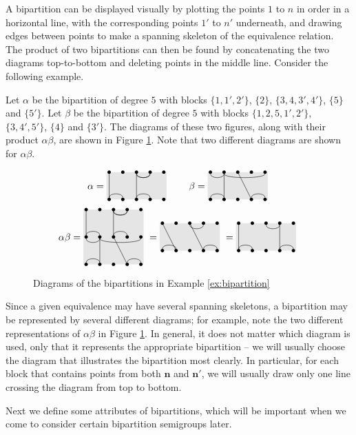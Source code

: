 A bipartition can be displayed visually by plotting the points $1$ to $n$ in
order in a horizontal line, with the corresponding points $1'$ to $n'$
underneath, and drawing edges between points to make a spanning skeleton of the
equivalence relation.  The product of two bipartitions can then be found by
concatenating the two diagrams top-to-bottom and deleting points in the middle
line.  Consider the following example.

\begin{example}
  \label{ex:bipartition}
  Let $\alpha$ be the bipartition of degree $5$ with blocks $\{1, 1', 2'\}$,
  $\{2\}$, $\{3, 4, 3', 4'\}$, $\{5\}$ and $\{5'\}$.  Let $\beta$ be the
  bipartition of degree $5$ with blocks $\{1, 2, 5, 1', 2'\}$, $\{3, 4', 5'\}$,
  $\{4\}$ and $\{3'\}$.  The diagrams of these two figures, along with their
  product $\alpha \beta$, are shown in Figure \ref{fig:bipartition-example}.
  Note that two different diagrams are shown for $\alpha \beta$.
  \begin{figure}[ht]
    \centering
    $$\alpha = \bipartdiag{\tv11\bc12 \tc34 \tv33\tc34\bc34} \qquad
    \beta = \bipartdiag{\tc12\tc25\tv22\bc12 \tv34\bc45}$$
    $$\alpha \beta = \doublebipartdiag{\utv11\ubc12 \utc34 \utv33\utc34\ubc34
      \tc12\tc25\tv22\bc12 \tv34\bc45}
    = \bipartdiag{\tv12\bc12 \tc34\tv34\bc45}
    = \bipartdiag{\tv11\bc12 \tc34\tv44\bc45}$$
    \caption{Diagrams of the bipartitions in Example \ref{ex:bipartition}}
    \label{fig:bipartition-example}
  \end{figure}
\end{example}

Since a given equivalence may have several spanning skeletons, a bipartition may
be represented by several different diagrams; for example, note the two
different representations of $\alpha \beta$ in Figure
\ref{fig:bipartition-example}.  In general, it does not matter which diagram is
used, only that it represents the appropriate bipartition -- we will usually
choose the diagram that illustrates the bipartition most clearly.  In
particular, for each block that contains points from both $\mathbf{n}$ and
$\mathbf{n}'$, we will usually draw only one line crossing the diagram from top
to bottom.

Next we define some attributes of bipartitions, which will be important when we
come to consider certain bipartition semigroups later.

